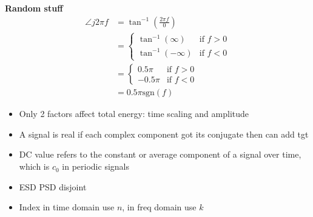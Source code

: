 \documentclass[landscape,a4paper]{extarticle}
\newcommand{\sgn}{\text{sgn}}
\begin{document}
\begin{multicols*}{5}
    \textbf{Random stuff}
    \begin{align*}
        \angle j 2\pi f &= \tan^{-1}\left(\frac{2\pi f}{0}\right)\\
        &= \begin{cases}
            \tan^{-1}(\infty) &\text{if }f > 0\\
            \tan^{-1}(-\infty) &\text{if }f < 0
        \end{cases}\\
        &= \begin{cases}
            0.5 \pi &\text{if } f>0\\
            -0.5 \pi &\text{if } f < 0
        \end{cases}\\
        &= 0.5\pi \sgn(f)
    \end{align*}

    \begin{itemize}
        \item Only 2 factors affect total energy: time scaling and amplitude
        \item A signal is real if each complex component got its conjugate then can add tgt
        \item DC value refers to the constant or average component of a signal over time, which is $c_0$ in periodic signals
        \item ESD PSD disjoint
        \item Index in time domain use $n$, in freq domain use $k$
    \end{itemize}

\end{multicols*}
\end{document}
